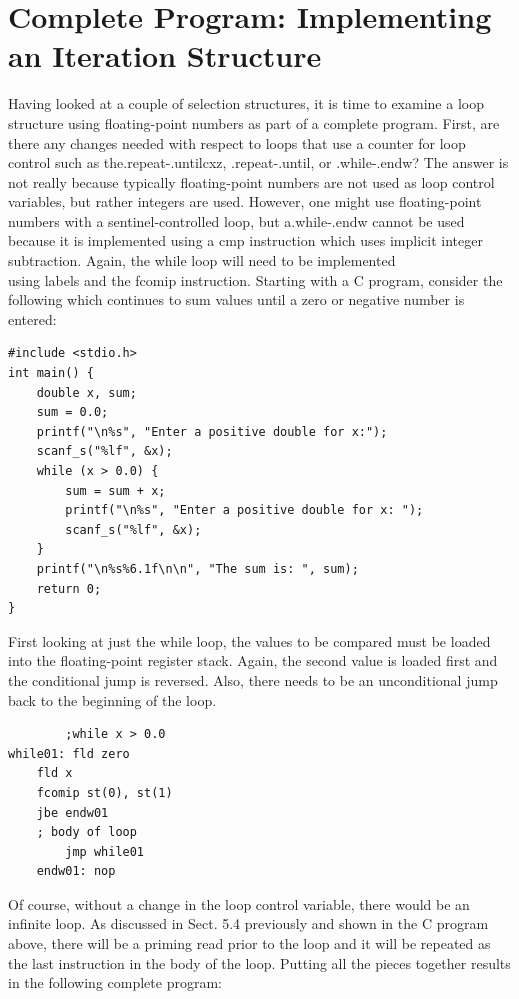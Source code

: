 \documentclass[10pt]{book}
\begin{document}
\section{Complete Program: Implementing an Iteration Structure}
Having looked at a couple of selection structures, it is time to examine a loop structure using floating-point numbers as part of a complete program. First, are there any changes needed with respect to loops that use a counter for loop control such as the.repeat-.untilcxz, .repeat-.until, or .while-.endw? The answer is not really because typically floating-point numbers are not used as loop control variables, but rather integers are used. However, one might use floating-point numbers with a sentinel-controlled loop, but a.while-.endw cannot be used because it is implemented using a cmp instruction which uses implicit integer subtraction. Again, the while loop will need to be implemented\\
using labels and the fcomip instruction. Starting with a C program, consider the following which continues to sum values until a zero or negative number is entered:
\begin{verbatim}
#include <stdio.h>
int main() {
    double x, sum;
    sum = 0.0;
    printf("\n%s", "Enter a positive double for x:");
    scanf_s("%lf", &x);
    while (x > 0.0) {
        sum = sum + x;
        printf("\n%s", "Enter a positive double for x: ");
        scanf_s("%lf", &x);
    }
    printf("\n%s%6.1f\n\n", "The sum is: ", sum);
    return 0;
}
\end{verbatim}

First looking at just the while loop, the values to be compared must be loaded into the floating-point register stack. Again, the second value is loaded first and the conditional jump is reversed. Also, there needs to be an unconditional jump back to the beginning of the loop.

\begin{verbatim}
        ;while x > 0.0
while01: fld zero
    fld x
    fcomip st(0), st(1)
    jbe endw01
    ; body of loop
        jmp while01
    endw01: nop
\end{verbatim}

Of course, without a change in the loop control variable, there would be an infinite loop. As discussed in Sect. 5.4 previously and shown in the C program above, there will be a priming read prior to the loop and it will be repeated as the last instruction in the body of the loop. Putting all the pieces together results in the following complete program:
\end{document}

